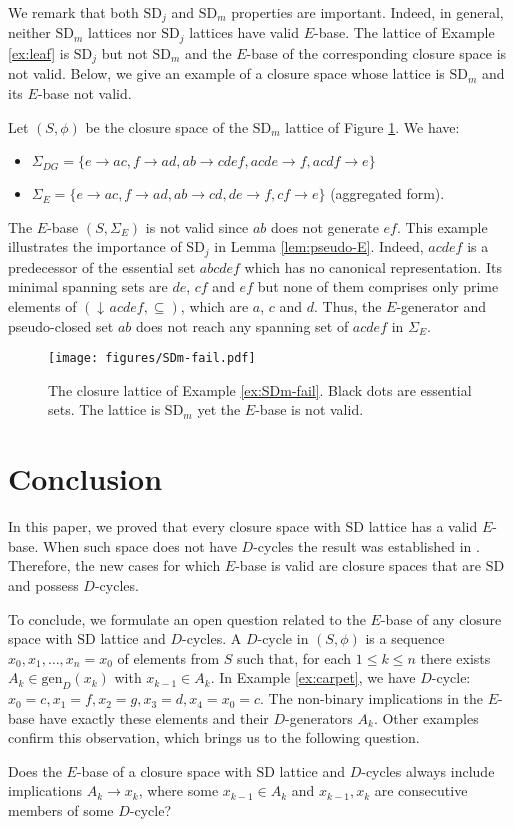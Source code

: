 \documentclass[12pt, a4paper]{article}
\def\FIGSDmfail{1.05}  %
\newcommand{\U}{S}  %
\newcommand{\SDj}{\mathrm{SD}_j}  %
\newcommand{\SDm}{\mathrm{SD}_m}  %
\newcommand{\SD}{\mathrm{SD}}  %
\DeclareMathOperator{\idl}{\downarrow\!}  %
\newcommand{\cl}{\phi}  %
\newcommand{\gen}{\mathrm{gen}}  %
\newcommand{\imp}{\rightarrow}  %
\newcommand{\is}{\Sigma}  %
\begin{document}
We remark that both $\SDj$ and $\SDm$ properties are important.
Indeed, in general, neither $\SDm$ lattices nor $\SDj$ lattices have valid $E$-base.
The lattice of Example \ref{ex:leaf} is $\SDj$ but not $\SDm$ and the $E$-base of the corresponding closure space is not valid.
Below, we give an example of a closure space whose lattice is $\SDm$ and its $E$-base not valid.

\begin{example} \label{ex:SDm-fail}
Let $(\U, \cl)$ be the closure space of the $\SDm$ lattice of Figure \ref{fig:SDm-fail}.
We have:
\begin{itemize}
    \item $\is_{DG} = \{e \imp ac, f \imp ad, ab \imp cde\!f, acde \imp f, acd\!f \imp e\}$
    \item $\is_E = \{e \imp ac, f \imp ad, ab \imp cd, de \imp f, c\!f \imp e\}$ (aggregated form).
\end{itemize}
The $E$-base $(\U, \is_E)$ is not valid since $ab$ does not generate $e\!f$.
This example illustrates the importance of $\SDj$ in Lemma \ref{lem:pseudo-E}.
Indeed, $acde\!f$ is a predecessor of the essential set $abcde\!f$ which has no canonical representation.
Its minimal spanning sets are $de$, $c\!f$ and $e\!f$ but none of them comprises only prime elements of  $(\idl acde\!f, \subseteq)$, which are $a$, $c$ and $d$.
Thus, the $E$-generator and pseudo-closed set $ab$ does not reach any spanning set of $acdef$ in $\is_E$.
%
\begin{figure}[ht!]
    \centering
    \texttt{[image: figures/SDm-fail.pdf]}
    \caption{The closure lattice of Example \ref{ex:SDm-fail}. Black dots are essential sets.
    The lattice is $\SDm$ yet the $E$-base is not valid.}
    \label{fig:SDm-fail}
\end{figure}
\end{example}

\section{Conclusion} \label{sec:conclusion}

In this paper, we proved that every closure space with $\SD$ lattice has a valid $E$-base.
When such space does not have $D$-cycles the result was established in \cite{adaricheva2013ordered}.
Therefore, the new cases for which $E$-base is valid are closure spaces that are $\SD$ and possess $D$-cycles. 

To conclude, we formulate an open question related to the $E$-base of any closure space with $\SD$ lattice and $D$-cycles.
A $D$-cycle in $(\U, \cl)$ is a sequence $x_0, x_1, \dots, x_n = x_0$ of elements from $S$ such that, for each $1 \leq k \leq n$ there exists $A_k \in \gen_D(x_k)$ with $x_{k-1}\in A_k$. 
In Example \ref{ex:carpet}, we have $D$-cycle: $x_0=c, x_1=f, x_2=g, x_3=d, x_4=x_0=c$. 
The non-binary implications in the $E$-base have exactly these elements and their $D$-generators $A_k$. 
Other examples confirm this observation, which brings us to the following question.

\begin{rstquestion}
Does the $E$-base of a closure space with $\SD$ lattice and $D$-cycles always include implications $A_k\to x_k$, where some $x_{k-1}\in A_k$ and $x_{k-1}, x_k$ are consecutive members of some $D$-cycle?
\end{rstquestion}



\end{document}
